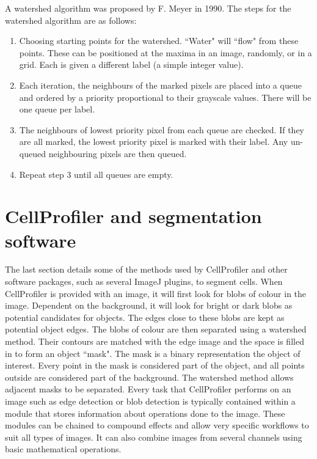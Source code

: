 A watershed algorithm was proposed by F. Meyer in 1990. The steps for the watershed algorithm are as follows:
\begin{enumerate}
	\item Choosing starting points for the watershed. ``Water" will ``flow" from these points. These can be positioned at the maxima in an image, randomly, or in a grid. Each is given a different label (a simple integer value).
	\item Each iteration, the neighbours of the marked pixels are placed into a queue and ordered by a priority proportional to their grayscale values. There will be one queue per label.
	\item The neighbours of lowest priority pixel from each queue are checked. If they are all marked, the lowest priority pixel is marked with their label. Any un-queued neighbouring pixels are then queued.
	\item Repeat step 3 until all queues are empty.
\end{enumerate}

\section{CellProfiler and segmentation software}

The last section details some of the methods used by CellProfiler and other software packages, such as several ImageJ plugins, to segment cells. When CellProfiler is provided with an image, it will first look for blobs of colour in the image. Dependent on the background, it will look for bright or dark blobs as potential candidates for objects. The edges close to these blobs are kept as potential object edges. The blobs of colour are then separated using a watershed method. Their contours are matched with the edge image and the space is filled in to form an object ``mask". The mask is a binary representation the object of interest. Every point in the mask is considered part of the object, and all points outside are considered part of the background. The watershed method allows adjacent masks to be separated. Every task that CellProfiler performs on an image such as edge detection or blob detection is typically contained within a module that stores information about operations done to the image. These modules can be chained to compound effects and allow very specific workflows to suit all types of images. It can also combine images from several channels using basic mathematical operations.


